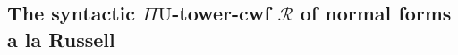 \documentclass{lmcs}
\def\UU{\mathrm{U}}
\def\t{\mathrm{t}}
\def\RawNe{\texttt{Ne}}
\def\var{\mathrm{var}}
\def\id{\mathrm{id}}
\def\p{\mathrm{p}}
\def\q{\mathrm{q}}
\def\app{\mathsf{app}}
\def\R{\mathcal{R}}
\begin{document}
%
%
%
%

\def\R{\mathcal{R}}

\subsection{The syntactic $\Pi\UU$-tower-cwf $\R$ of normal forms a la Russell}
\end{document}
